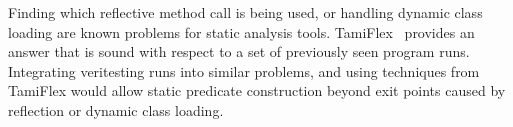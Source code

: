 %

%
%
Finding which reflective method call is being used, or handling dynamic class loading are known problems for static analysis tools.
%
TamiFlex~\cite{tamiflex} provides an answer that is sound with respect to a set of previously seen program runs.
%
Integrating veritesting runs into similar problems, and using techniques from TamiFlex would allow static predicate construction beyond exit points caused by reflection or dynamic class loading. 
